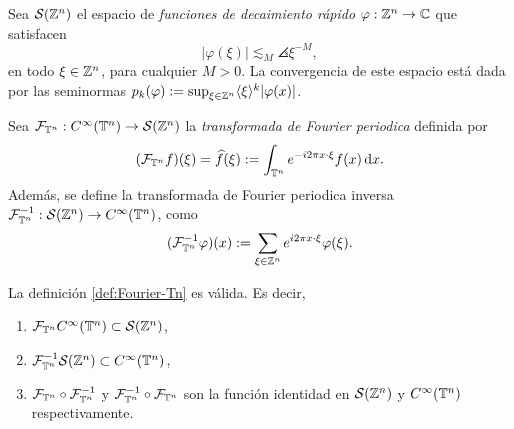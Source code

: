 \begin{definition}
	Sea $\mathcal{S}(\mathbb{Z}^n)$ el espacio de \textit{funciones de decaimiento rápido} $\varphi:\mathbb{Z}^n\rightarrow\mathbb{C}$ que satisfacen  
	\begin{equation*}
		|\varphi(\xi)| \lesssim_M \angles{\xi}^{-M},
	\end{equation*}
	en todo $\xi\in\mathbb{Z}^n$, para cualquier $M>0$. La convergencia de este espacio está dada por las seminormas $p_k(\varphi) := \sup_{\xi\in\mathbb{Z}^n}\langle\xi\rangle^k|\varphi(x)|$.
\end{definition}  
\begin{definition}\label{def:Fourier-Tn}
	Sea $\mathcal{F}_{\mathbb{T}^n}:C^\infty(\mathbb{T}^n) \rightarrow\mathcal{S}(\mathbb{Z}^n)$ la \textit{transformada de Fourier periodica} definida por 
	\begin{equation*}
		(\mathcal{F}_{\mathbb{T}^n}f)(\xi) = \widehat{f}(\xi) := \int_{\mathbb{T}^n} e^{-i2\pi x\cdot\xi} f(x) \mathop{}\!\mathrm{d} x.
	\end{equation*}
	Además, se define la transformada de Fourier periodica inversa $\mathcal{F}_{\mathbb{T}^n}^{-1}:\mathcal{S}(\mathbb{Z}^n)\rightarrow C^\infty(\mathbb{T}^n)$, como
	\begin{equation*}
		(\mathcal{F}_{\mathbb{T}^n}^{-1}\varphi)(x)  := \sum_{\xi\in\mathbb{Z}^n} e^{i2\pi x\cdot\xi} \varphi(\xi).
	\end{equation*}
\end{definition}
\begin{theorem}
	La definición \ref{def:Fourier-Tn} es válida. Es decir, 
	\begin{enumerate}
		\item $\mathcal{F}_{\mathbb{T}^n}C^\infty(\mathbb{T}^n) \subset \mathcal{S}(\mathbb{Z}^n)$,
		\item $\mathcal{F}_{\mathbb{T}^n}^{-1} \mathcal{S}(\mathbb{Z}^n) \subset C^\infty(\mathbb{T}^n)$,
		\item $\mathcal{F}_{\mathbb{T}^n} \circ \mathcal{F}_{\mathbb{T}^n}^{-1}$ y $\mathcal{F}_{\mathbb{T}^n}^{-1} \circ \mathcal{F}_{\mathbb{T}^n}$ son la función identidad en $\mathcal{S}(\mathbb{Z}^n)$ y $C^\infty(\mathbb{T}^n)$ respectivamente.
	\end{enumerate}
\end{theorem}
